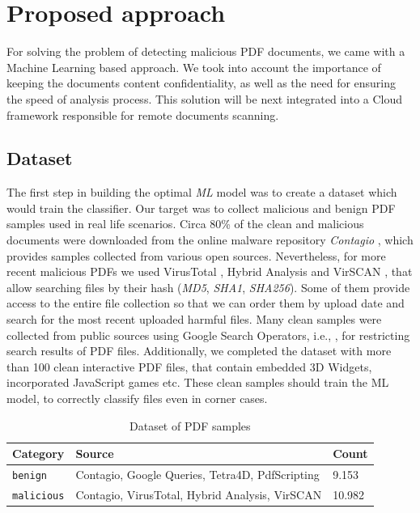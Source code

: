 \chapter{Proposed approach}
\label{chapter:proposedApproach}

For solving the problem of detecting malicious PDF documents, we came with a Machine Learning based approach. We took into account the importance of keeping the documents content confidentiality, as well as the need for ensuring the speed of analysis process. This solution will be next integrated into a Cloud framework responsible for remote documents scanning.

\section{Dataset}
\label{section:dataset}
The first step in building the optimal \textit{ML} model was to create a dataset which would train the classifier. Our target was to collect malicious and benign PDF samples used in real life scenarios. Circa 80\% of the clean and malicious documents were downloaded from the online malware repository \textit{Contagio} \cite{contagio}, which provides samples collected from various open sources. Nevertheless, for more recent malicious PDFs we used VirusTotal \cite{virustotal}, Hybrid Analysis \cite{hybridanalysis} and VirSCAN \cite{virscan}, that allow searching files by their hash (\textit{MD5}, \textit{SHA1}, \textit{SHA256}). Some of them provide access to the entire file collection so that we can order them by upload date and search for the most recent uploaded harmful files. Many clean samples were collected from public sources using Google Search Operators, i.e., , for restricting search results of PDF files. Additionally, we completed the dataset with more than 100 clean interactive PDF files, that contain embedded 3D Widgets, incorporated JavaScript games etc. These clean samples should train the ML model, to correctly classify files even in corner cases. 

\begin{table}[H]
	\caption{Dataset of PDF samples}
	\label{table:pdfSamples}
        \centering
            \begin{tabular}{p{2.5cm} p{9.5cm} p{1.5cm}}
                \toprule
                
				\textbf{Category} & \textbf{Source} & \textbf{Count} \\
				\hline 
                \texttt{benign} & Contagio, Google Queries, Tetra4D, PdfScripting  & 9.153 \\
                \hline
				\texttt{malicious} & Contagio, VirusTotal, Hybrid Analysis, VirSCAN & 10.982 \\
                
                \bottomrule
			\end{tabular}
\end{table}

